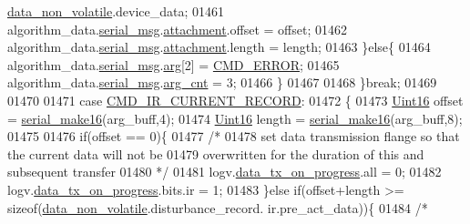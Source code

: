 \begin{DoxyCode}
{{{{{      \hyperlink{a00060_a76ac5f917f5308dcd83de0d7c94559fb}{data\_non\_volatile}.device\_data;
01461                        algorithm\_data.\hyperlink{a00016_afcf5f557aea688aad985eec15269c1da}{serial\_msg}.\hyperlink{a00031_a040f6d5d58d18d8aeaf447eda7f50172}{attachment}.offset      = offset;
01462                        algorithm\_data.\hyperlink{a00016_afcf5f557aea688aad985eec15269c1da}{serial\_msg}.\hyperlink{a00031_a040f6d5d58d18d8aeaf447eda7f50172}{attachment}.length      = length;
01463                      \}\textcolor{keywordflow}{else}\{
01464                          algorithm\_data.\hyperlink{a00016_afcf5f557aea688aad985eec15269c1da}{serial\_msg}.\hyperlink{a00031_af7d6f762438c80072bd9dc0e4dd4ae1e}{arg}[2]               = 
      \hyperlink{a00021_a1764a522e9c1a59a59be8757c69fa494}{CMD\_ERROR};
01465                          algorithm\_data.\hyperlink{a00016_afcf5f557aea688aad985eec15269c1da}{serial\_msg}.\hyperlink{a00031_a7b79f40e2eeec288091afd340bf8f591}{arg\_cnt}              = 3;
01466                      \}
01467 
01468                 \}\textcolor{keywordflow}{break};
01469 
01470 
01471                  \textcolor{keywordflow}{case}  \hyperlink{a00021_a4dcce4fd3ff29eb6782f3228901f99cf}{CMD\_IR\_CURRENT\_RECORD}:
01472                 \{
01473                     \hyperlink{a00072_a59a9f6be4562c327cbfb4f7e8e18f08b}{Uint16} offset = \hyperlink{a00031_abc17de32f14103a5be219df0d4ad9176}{serial\_make16}(arg\_buff,4);
01474                     \hyperlink{a00072_a59a9f6be4562c327cbfb4f7e8e18f08b}{Uint16} length = \hyperlink{a00031_abc17de32f14103a5be219df0d4ad9176}{serial\_make16}(arg\_buff,8);
01475 
01476                     \textcolor{keywordflow}{if}(offset == 0)\{
01477                          \textcolor{comment}{/*}
01478 \textcolor{comment}{                         set data transmission flange so that the current data will not be}
01479 \textcolor{comment}{                         overwritten for the duration of this and subsequent transfer}
01480 \textcolor{comment}{                       */}
01481                         logv.\hyperlink{a00021_a6cdefde69642ef511e3252c38be68516}{data\_tx\_on\_progress}.all       = 0;
01482                         logv.\hyperlink{a00021_a6cdefde69642ef511e3252c38be68516}{data\_tx\_on\_progress}.bits.ir   = 1;
01483                     \}\textcolor{keywordflow}{else} \textcolor{keywordflow}{if}(offset+length >= \textcolor{keyword}{sizeof}(\hyperlink{a00060_a76ac5f917f5308dcd83de0d7c94559fb}{data\_non\_volatile}.disturbance\_record.
      ir.pre\_act\_data))\{
01484                         \textcolor{comment}{/*}
}}}}}
\end{DoxyCode}
